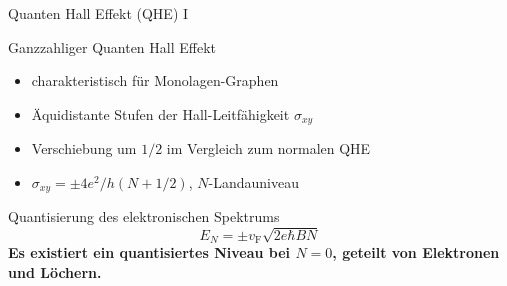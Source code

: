 \documentclass[../defence.tex]{subfiles}
\begin{document}
  \begin{frame}{Quanten Hall Effekt (QHE) I}
    \begin{block}{Ganzzahliger Quanten Hall Effekt}
      \begin{itemize}
        \item charakteristisch für Monolagen-Graphen
        \item Äquidistante Stufen  der Hall-Leitfähigkeit $\sigma_{xy}$
        \item Verschiebung um $1/2$ im Vergleich zum normalen QHE
        \item $\sigma_{xy}=\pm 4e^2/h (N+1/2)$, $N$-Landauniveau
      \end{itemize}
    \end{block}
    \begin{alertblock}{Quantisierung des elektronischen Spektrums}
      \begin{equation*}
        E_N=\pm v_\mathrm{F}\sqrt{2e \hbar BN}
      \end{equation*}
      \textbf{Es existiert ein quantisiertes Niveau bei $N=0$, geteilt von Elektronen und Löchern.}
    \end{alertblock}
  \end{frame}
\end{document}
